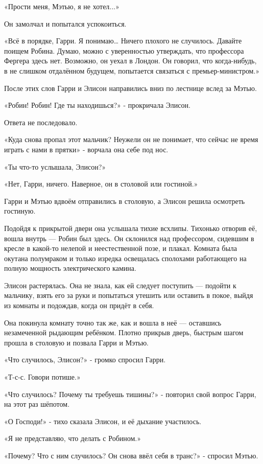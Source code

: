 \documentclass[a5paper, 9pt,
final, openany, twoside=true]{memoir}
\begin{document}
«Прости меня, Мэтью, я не хотел...»

Он замолчал и попытался успокоиться.

«Всё в порядке, Гарри. Я понимаю… Ничего плохого не случилось. Давайте поищем Робина. Думаю, можно с уверенностью утверждать, что профессора Фергера здесь нет. Возможно, он уехал в Лондон. Он говорил, что когда-нибудь, в не слишком отдалённом будущем, попытается связаться с премьер-министром.»

После этих слов Гарри и Элисон направились вниз по лестнице вслед за Мэтью.

«Робин! Робин! Где ты находишься?» - прокричала Элисон.

Ответа не последовало.

«Куда снова пропал этот мальчик? Неужели он не понимает, что сейчас не время играть с нами в прятки» - ворчала она себе под нос.

«Ты что-то услышала, Элисон?»

«Нет, Гарри, ничего. Наверное, он в столовой или гостиной.»

Гарри и Мэтью вдвоём отправились в столовую, а Элисон решила осмотреть гостиную.

Подойдя к прикрытой двери она услышала тихие всхлипы. Тихонько отворив её, вошла внутрь — Робин был здесь. Он склонился над профессором, сидевшим в кресле в какой-то нелепой и неестественной позе, и плакал. Комната была окутана полумраком и только изредка освещалась сполохами работающего на полную мощность электрического камина.

Элисон растерялась. Она не знала, как ей следует поступить — подойти к мальчику, взять его за руки и попытаться утешить или оставить в покое, выйдя из комнаты и подождав, когда он придёт в себя.

Она покинула комнату точно так же, как и вошла в неё —  оставшись незамеченной рыдающим ребёнком. Плотно прикрыв дверь, быстрым шагом прошла в столовую и позвала Гарри и Мэтью.

«Что случилось, Элисон?» - громко спросил Гарри.

«Т-с-с. Говори потише.»

«Что случилось? Почему ты требуешь тишины?» - повторил свой вопрос Гарри, на этот раз шёпотом.

«О Господи!» - тихо сказала Элисон, и её дыхание участилось.

«Я не представляю, что делать с Робином.»

«Почему? Что с ним случилось? Он снова ввёл себя в транс?» - спросил Мэтью.
\end{document}
